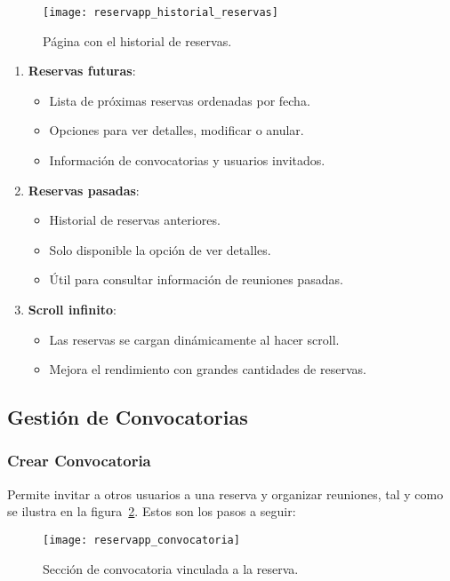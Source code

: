 \begin{figure}[H]
	\centering
		\texttt{[image: reservapp\_historial\_reservas]}
	\caption{Página con el historial de reservas.}
	\label{fig:reservapp_historial_reservas}
\end{figure}

\begin{enumerate}
   \item \textbf{Reservas futuras}:
   \begin{itemize}
      \item Lista de próximas reservas ordenadas por fecha.
	  \item Opciones para ver detalles, modificar o anular.
	  \item Información de convocatorias y usuarios invitados.
   \end{itemize}
   \item \textbf{Reservas pasadas}:
   \begin{itemize}
      \item Historial de reservas anteriores.
      \item Solo disponible la opción de ver detalles.
      \item Útil para consultar información de reuniones pasadas.
   \end{itemize}
   \item \textbf{Scroll infinito}:
   \begin{itemize}
      \item Las reservas se cargan dinámicamente al hacer scroll.
      \item Mejora el rendimiento con grandes cantidades de reservas.
   \end{itemize}
\end{enumerate}

\subsection{Gestión de Convocatorias}

\subsubsection{Crear Convocatoria}
Permite invitar a otros usuarios a una reserva y organizar reuniones, tal y como se ilustra en la figura~\ref{fig:reservapp_convocatoria}. Estos son los pasos a seguir:

\begin{figure}[H]
	\centering
		\texttt{[image: reservapp\_convocatoria]}
	\caption{Sección de convocatoria vinculada a la reserva.}
	\label{fig:reservapp_convocatoria}
\end{figure}


